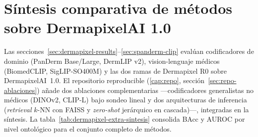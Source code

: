 \section{Síntesis comparativa de métodos sobre DermapixelAI 1.0}
\label{sec:dermapixel-extra}
\label{sec:dermapixel-extra-sintesis}

Las secciones~\ref{sec:dermapixel-results}--\ref{sec:spanderm-clip}
evalúan codificadores de dominio (PanDerm Base/Large, DermLIP v2),
vision-lenguaje médicos (BiomedCLIP, SigLIP-SO400M) y las dos ramas de
Dermapixel R0 sobre DermapixelAI~1.0. El repositorio reproducible
(\ref{cap:repo}, sección~\ref{sec:repo-ablaciones}) añade
dos ablaciones complementarias ---codificadores generalistas no
médicos (DINOv2, CLIP-L) bajo sondeo lineal y dos arquitecturas de
inferencia (\emph{retrieval} $k$-NN con FAISS y \emph{zero-shot}
jerárquico en cascada)---, integradas en la síntesis. La
tabla~\ref{tab:dermapixel-extra-sintesis} consolida BAcc y AUROC por
nivel ontológico para el conjunto completo de métodos.

